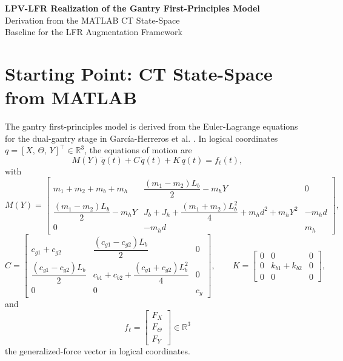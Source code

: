 \documentclass[11pt]{article}
\newcommand{\R}{\mathbb{R}}
\begin{document}
\begin{center}
    {\LARGE\bfseries LPV-LFR Realization of the Gantry First-Principles Model}\\[0.5em]
    {\large Derivation from the MATLAB CT State-Space}\\[0.4em]
    {\normalsize Baseline for the LFR Augmentation Framework}
\end{center}

\vspace{1em}

\section{Starting Point: CT State-Space from MATLAB}

The gantry first-principles model is derived from the Euler-Lagrange equations
for the dual-gantry stage in García-Herreros et al. \cite{garcia2013model}.
In logical coordinates $q = [X,\,\Theta,\,Y]^\top \in \R^3$, the equations of motion are
\begin{equation}
    M(Y)\,\ddot{q}(t) + C\,\dot{q}(t) + K\,q(t) = f_\ell(t),
    \label{eq:eom}
\end{equation}
with
\begin{equation}
    M(Y) =
    \begin{bmatrix}
        m_1 + m_2 + m_b + m_h &
        \dfrac{(m_1 - m_2)L_b}{2} - m_h Y &
        0 \\[6pt]
        \dfrac{(m_1 - m_2)L_b}{2} - m_h Y &
        J_b + J_h + \dfrac{(m_1+m_2)L_b^2}{4} + m_h d^2 + m_h Y^2 &
        -m_h d \\[6pt]
        0 & -m_h d & m_h
    \end{bmatrix},
    \label{eq:M_full}
\end{equation}
\begin{equation}
    C =
    \begin{bmatrix}
        c_{g1} + c_{g2} & \dfrac{(c_{g1} - c_{g2})L_b}{2} & 0 \\[6pt]
        \dfrac{(c_{g1} - c_{g2})L_b}{2} &
        c_{b1} + c_{b2} + \dfrac{(c_{g1}+c_{g2})L_b^2}{4} &
        0 \\[6pt]
        0 & 0 & c_y
    \end{bmatrix},
    \qquad
    K =
    \begin{bmatrix}
        0 & 0 & 0 \\
        0 & k_{b1} + k_{b2} & 0 \\
        0 & 0 & 0
    \end{bmatrix},
    \label{eq:CK_full}
\end{equation}
and
\begin{equation}
    f_\ell =
    \begin{bmatrix}
        F_X \\
        F_\Theta \\
        F_Y
    \end{bmatrix}
    \in \R^3
    \label{eq:fell}
\end{equation}
the generalized-force vector in logical coordinates.
\end{document}
